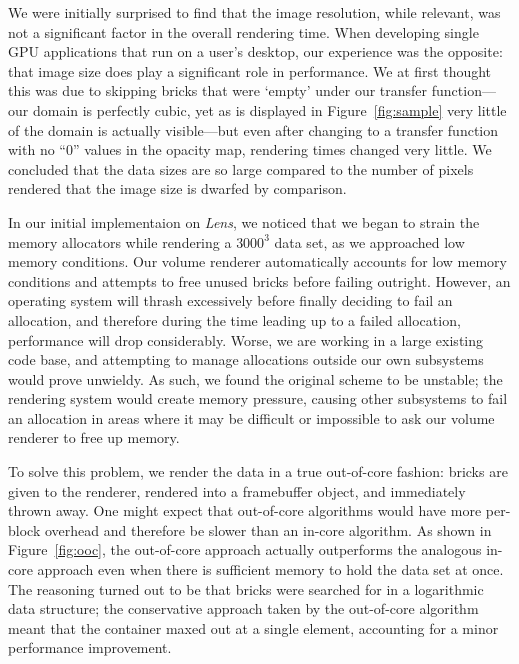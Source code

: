 We were initially surprised to find that the image resolution, while
relevant, was not a significant factor in the overall rendering
time.  When developing single GPU applications that run on a user's
desktop, our experience was the opposite: that image size does play a
significant role in performance.  We at first thought this was due to
skipping bricks that were `empty' under our transfer function---our
domain is perfectly cubic, yet as is displayed in
Figure~\ref{fig:sample} very little of the domain is actually
visible---but even after changing to a transfer function with no ``0''
values in the opacity map, rendering times changed very little.  We
concluded that the data sizes are so large compared to the number of
pixels rendered that the image size is dwarfed by comparison.

In our initial implementaion on \textit{Lens}, we noticed that we
began to strain the memory allocators while rendering a $3000^3$ data
set, as we approached low memory conditions.  Our volume renderer
automatically accounts for low memory conditions and attempts to free
unused bricks before failing outright.  However, an operating system
will thrash excessively before finally deciding to fail an allocation,
and therefore during the time leading up to a failed allocation,
performance will drop considerably.  Worse, we are working in a large
existing code base, and attempting to manage allocations outside our
own subsystems would prove unwieldy.  As such, we found the original
scheme to be unstable; the rendering system would create memory
pressure, causing other subsystems to fail an allocation in areas where
it may be difficult or impossible to ask our volume renderer to free up
memory.

To solve this problem, we render the data in a true out-of-core
fashion: bricks are given to the renderer, rendered into a framebuffer
object, and immediately thrown away.  One might expect that out-of-core
algorithms would have more per-block overhead and therefore be slower
than an in-core algorithm.
As shown in Figure~\ref{fig:ooc}, the out-of-core approach actually
outperforms the analogous in-core approach even when there is
sufficient memory to hold the data set at once.  The reasoning
turned out to be that bricks were searched for in a logarithmic data
structure; the conservative approach taken by the out-of-core algorithm
meant that the container maxed out at a single element, accounting for
a minor performance improvement.

